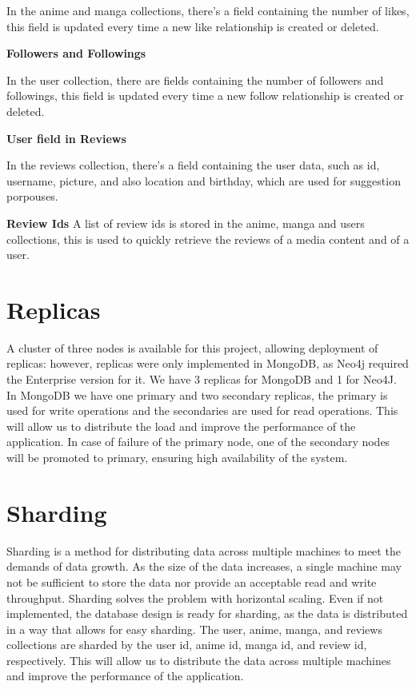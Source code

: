 In the anime and manga collections, there's a field containing the number of likes, this field is updated every time a new like relationship is created or deleted.


\textbf{Followers and Followings}


In the user collection, there are fields containing the number of followers and followings, this field is updated every time a new follow relationship is created or deleted.


\textbf{User field in Reviews}


In the reviews collection, there's a field containing the user data, such as id, username, picture, and also location and birthday, which are used for suggestion porpouses.


\textbf{Review Ids}
A list of review ids is stored in the anime, manga and users collections, this is used to quickly retrieve the reviews of a media content and of a user.

\section{Replicas}
A cluster of three nodes is available for this project, allowing deployment of replicas: however, replicas were only implemented in MongoDB, as Neo4j required the Enterprise version for it.
We have 3 replicas for MongoDB and 1 for Neo4J.
In MongoDB we have one primary and two secondary replicas, the primary is used for write operations and the secondaries are used for read operations. This will allow us to distribute the load and improve the performance of the application. In case of failure of the primary node, one of the secondary nodes will be promoted to primary, ensuring high availability of the system.

\section{Sharding}
Sharding is a method for distributing data across multiple machines to meet the demands of data growth. As the size of the data increases, a single machine may not be sufficient to store the data nor provide an acceptable read and write throughput. Sharding solves the problem with horizontal scaling. Even if not implemented, the database design is ready for sharding, as the data is distributed in a way that allows for easy sharding. The user, anime, manga, and reviews collections are sharded by the user id, anime id, manga id, and review id, respectively. This will allow us to distribute the data across multiple machines and improve the performance of the application.

